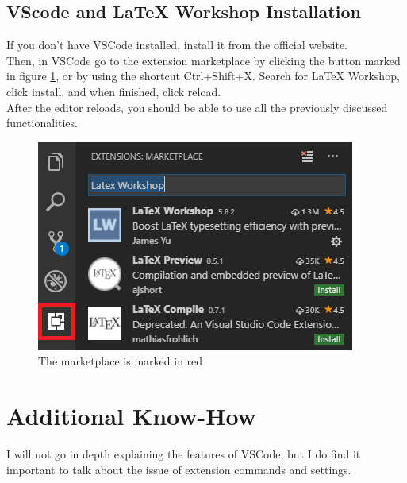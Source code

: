 \documentclass{article}
\newcommand{\latex}{\LaTeX\xspace}
\begin{document}
\subsection{VScode and \latex Workshop Installation}
If you don't have VSCode installed, install it from the official website\footnotemark[1].\\
Then, in VSCode go to the extension marketplace by clicking the button marked in figure \ref{fig:vscode_marketplace}, or by using the shortcut Ctrl+Shift+X. Search for \latex Workshop, click install, and when finished, click reload.\\
After the editor reloads, you should be able to use all the previously discussed functionalities.
\begin{figure}
	\includegraphics[width=\linewidth]{../resources/vscode_marketplace.png}
	\caption{The marketplace is marked in red}
	\label{fig:vscode_marketplace}
\end{figure}


\section{Additional Know-How}
I will not go in depth explaining the features of VSCode, but I do find it important to talk about the issue of extension commands and settings.
\end{document}

